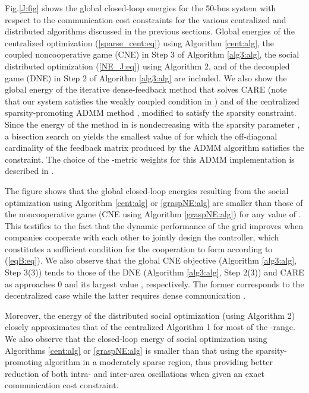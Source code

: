 \documentclass[12pt, draftclsnofoot,onecolumn]{IEEEtran}
\begin{document}
Fig.\ref{J:fig} shows the global closed-loop energies for the 50-bus system with respect to the communication cost constraints for the various centralized and distributed algorithms discussed in the previous sections. Global energies of the centralized optimization (\ref{sparse_cent:eq}) using Algorithm \ref{cent:alg}, the coupled noncooperative game (CNE) in Step 3 of Algorithm \ref{alg3:alg}, the social distributed optimization (\ref{NE_J:eq}) using Algorithm 2, and of the decoupled game (DNE) in Step 2 of Algorithm \ref{alg3:alg} are included. We also show the global energy of the iterative dense-feedback method that solves CARE \cite{Mukaidani2006} (note that our system satisfies the weakly coupled condition in \cite{Mukaidani2006}) and of the centralized sparsity-promoting ADMM method \cite{dorjovchebulTPS14}, modified to satisfy the sparsity constraint. Since the energy of the method in \cite{dorjovchebulTPS14} is nondecreasing with the sparsity parameter , a bisection search on  yields the smallest value of  for which the off-diagonal cardinality of the feedback matrix produced by the ADMM algorithm satisfies the constraint. The choice of the -metric weights for this ADMM implementation is described in \cite{lianensuring}.

The figure shows that the global closed-loop energies resulting from the social optimization using Algorithm {\ref{cent:alg}} or {\ref{graspNE:alg}} are smaller than those of the noncooperative game (CNE using Algorithm \ref{graspNE:alg}) for any value of . This testifies to the fact that the dynamic performance of the grid improves when companies cooperate with each other to jointly design the controller, which constitutes a sufficient condition for the cooperation to form according to ({\ref{eqB:eq}}). We also observe that the global CNE objective (Algorithm \ref{alg3:alg}, Step 3(3)) tends to those of the DNE (Algorithm \ref{alg3:alg}, Step 2(3)) and CARE as  approaches 0 and its largest value , respectively. The former corresponds to the decentralized case \cite{lianensuring} while the latter requires dense communication \cite{Mukaidani2006}.   



Moreover, the energy  of the distributed social optimization (using Algorithm 2) closely approximates that of the centralized Algorithm 1 for most of the -range. We also observe that the closed-loop energy of social optimization using Algorithms {\ref{cent:alg}} or {\ref{graspNE:alg}} is smaller than that using the sparsity-promoting algorithm in a moderately sparse region, thus providing better reduction of both intra- and inter-area oscillations when given an exact communication cost constraint.
\end{document}
